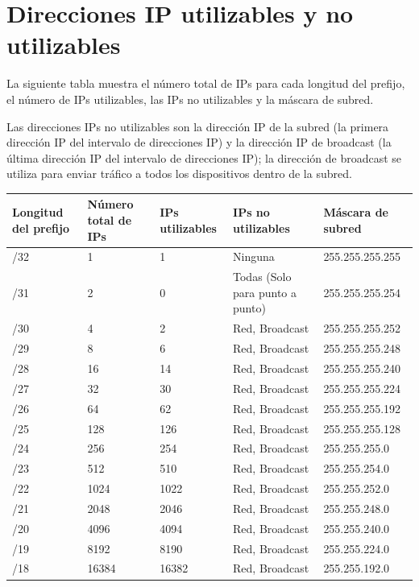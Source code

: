 \section{Direcciones IP utilizables y no utilizables}

La siguiente tabla muestra el número total de IPs para cada longitud del prefijo, el número de IPs utilizables, las IPs no utilizables y la máscara de subred.

Las direcciones IPs no utilizables son la dirección IP de la subred (la primera dirección IP del intervalo de direcciones IP) y la dirección IP de broadcast (la última dirección IP del intervalo de direcciones IP); la dirección de broadcast se utiliza para enviar tráfico a todos los dispositivos dentro de la subred.

\begin{center}
\small
\begin{tabularx}{\linewidth}{|X|X|X|X|X|}
\hline
Longitud del prefijo & Número total de IPs & IPs utilizables & IPs no utilizables & Máscara de subred \\ \hline
/32 & 1 & 1 & Ninguna & 255.255.255.255 \\ \hline
/31 & 2 & 0 & Todas (Solo para punto a punto) & 255.255.255.254 \\ \hline
/30 & 4 & 2 & Red, Broadcast & 255.255.255.252 \\ \hline
/29 & 8 & 6 & Red, Broadcast & 255.255.255.248 \\ \hline
/28 & 16 & 14 & Red, Broadcast & 255.255.255.240 \\ \hline
/27 & 32 & 30 & Red, Broadcast & 255.255.255.224 \\ \hline
/26 & 64 & 62 & Red, Broadcast & 255.255.255.192 \\ \hline
/25 & 128 & 126 & Red, Broadcast & 255.255.255.128 \\ \hline
/24 & 256 & 254 & Red, Broadcast & 255.255.255.0 \\ \hline
/23 & 512 & 510 & Red, Broadcast & 255.255.254.0 \\ \hline
/22 & 1024 & 1022 & Red, Broadcast & 255.255.252.0 \\ \hline
/21 & 2048 & 2046 & Red, Broadcast & 255.255.248.0 \\ \hline
/20 & 4096 & 4094 & Red, Broadcast & 255.255.240.0 \\ \hline
/19 & 8192 & 8190 & Red, Broadcast & 255.255.224.0 \\ \hline
/18 & 16384 & 16382 & Red, Broadcast & 255.255.192.0 \\ \hline

\end{tabularx}
\end{center}
